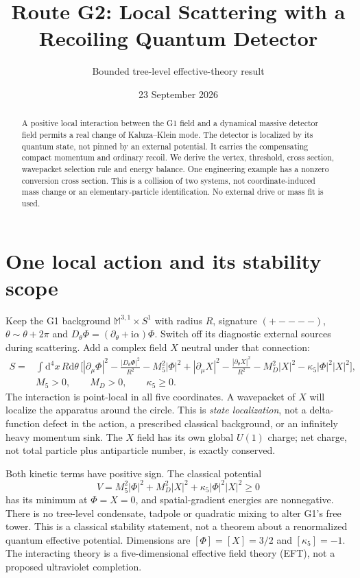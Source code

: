 \documentclass[11pt,a4paper]{article}
\title{Route G2: Local Scattering with a Recoiling Quantum Detector}
\author{Bounded tree-level effective-theory result}
\date{23 September 2026}
\newcommand{\dd}{\mathrm d}
\newcommand{\ii}{\mathrm i}
\begin{document}
\maketitle
\begin{abstract}
A positive local interaction between the G1 field and a dynamical
massive detector field permits a real change of Kaluza--Klein mode.
The detector is localized by its quantum state, not pinned by an
external potential. It carries the compensating compact momentum
and ordinary recoil. We derive the vertex, threshold, cross section,
wavepacket selection rule and energy balance. One engineering example
has a nonzero conversion cross section. This is a collision of two
systems, not coordinate-induced mass change or an elementary-particle
identification. No external drive or mass fit is used.
\end{abstract}

\section{One local action and its stability scope}
Keep the G1 background $\mathbb M^{3,1}\times S^1$ with radius $R$,
signature $(+----)$, $\theta\sim\theta+2\pi$ and
$D_\theta\Phi=(\partial_\theta+\ii\alpha)\Phi$.
Switch off its diagnostic external sources during scattering. Add a
complex field $X$ neutral under that connection:
\begin{align}
 S={}&\int\dd^4x\,R\dd\theta\,
 \bigg[
 |\partial_\mu\Phi|^2-\frac{|D_\theta\Phi|^2}{R^2}
 -M_5^2|\Phi|^2
 +|\partial_\mu X|^2-\frac{|\partial_\theta X|^2}{R^2}
 -M_D^2|X|^2-\kappa_5|\Phi|^2|X|^2
 \bigg], \label{eq:action}\\
 &M_5>0,\qquad M_D>0,\qquad \kappa_5\geq0 .
\end{align}
The interaction is point-local in all five coordinates. A wavepacket
of $X$ will localize the apparatus around the circle. This is
\emph{state localization}, not a delta-function defect in the action,
a prescribed classical background, or an infinitely heavy momentum
sink. The $X$ field has its own global $U(1)$ charge; net charge, not
total particle plus antiparticle number, is exactly conserved.

Both kinetic terms have positive sign. The classical potential
\begin{equation}
 V=M_5^2|\Phi|^2+M_D^2|X|^2+\kappa_5|\Phi|^2|X|^2\geq0
\end{equation}
has its minimum at $\Phi=X=0$, and spatial-gradient energies are
nonnegative. There is no tree-level condensate, tadpole or quadratic
mixing to alter G1's free tower. This is a classical stability statement,
not a theorem about a renormalized quantum effective potential.
Dimensions are $[\Phi]=[X]=3/2$ and $[\kappa_5]=-1$.
The interacting theory is a five-dimensional effective field theory
(EFT), not a proposed ultraviolet completion.
\end{document}

